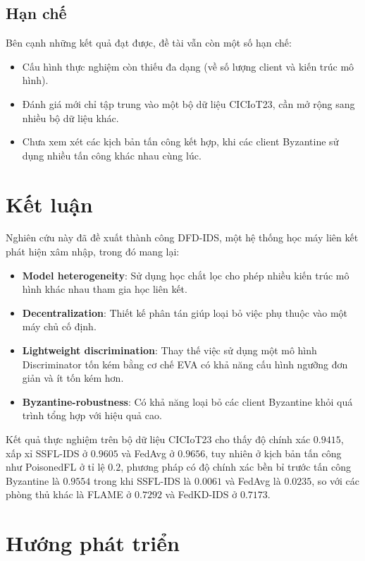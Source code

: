 \subsection{Hạn chế}
Bên cạnh những kết quả đạt được, đề tài vẫn còn một số hạn chế:
\begin{itemize}
    \item Cấu hình thực nghiệm còn thiếu đa dạng (về số lượng client và kiến trúc mô hình).
    \item Đánh giá mới chỉ tập trung vào một bộ dữ liệu CICIoT23, cần mở rộng sang nhiều bộ dữ liệu khác.
    \item Chưa xem xét các kịch bản tấn công kết hợp, khi các client Byzantine sử dụng nhiều tấn công khác nhau cùng lúc.
\end{itemize}

\section{Kết luận}
\label{sec:conclusion}

Nghiên cứu này đã đề xuất thành công DFD-IDS, một hệ thống học máy liên kết phát hiện xâm nhập, trong đó mang lại:

\begin{itemize}
    \item \textbf{Model heterogeneity}: Sử dụng học chắt lọc cho phép nhiều kiến trúc mô hình khác nhau tham gia học liên kết.
    \item \textbf{Decentralization}: Thiết kế phân tán giúp loại bỏ việc phụ thuộc vào một máy chủ cố định.
    \item \textbf{Lightweight discrimination}: Thay thế việc sử dụng một mô hình Discriminator tốn kém bằng cơ chế EVA có khả năng cấu hình ngưỡng đơn giản và ít tốn kém hơn.
    \item \textbf{Byzantine-robustness}: Có khả năng loại bỏ các client Byzantine khỏi quá trình tổng hợp với hiệu quả cao.
\end{itemize}

Kết quả thực nghiệm trên bộ dữ liệu CICIoT23 cho thấy độ chính xác $0.9415$, xấp xỉ SSFL-IDS ở $0.9605$ và FedAvg ở $0.9656$, tuy nhiên ở kịch bản tấn công như PoisonedFL ở tỉ lệ $0.2$, phương pháp có độ chính xác bền bỉ trước tấn công Byzantine là $0.9554$ trong khi SSFL-IDS là $0.0061$ và FedAvg là $0.0235$, so với các phòng thủ khác là FLAME ở $0.7292$ và FedKD-IDS ở $0.7173$.

\section{Hướng phát triển}
\label{sec:future}

